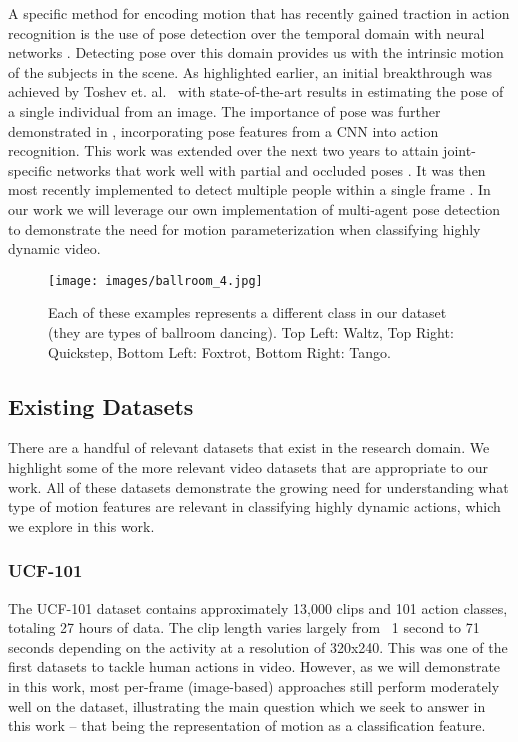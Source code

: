 \documentclass[10pt,twocolumn,letterpaper]{article}
\begin{document}
A specific method for encoding motion that has recently gained traction in action recognition is the use of pose detection over the temporal domain with neural networks \cite{cheron2015p}\cite{liu2016spatio}\cite{toshev2014deeppose}\cite{wei2016convolutional}. Detecting pose over this domain provides us with the intrinsic motion of the subjects in the scene. As highlighted earlier, an initial breakthrough was achieved by Toshev et. al.~\cite{toshev2014deeppose} with state-of-the-art results in estimating the pose of a single individual from an image. The importance of pose was further demonstrated in \cite{cheron2015p}, incorporating pose features from a CNN into action recognition. This work was extended over the next two years to attain joint-specific networks that work well with partial and occluded poses \cite{wei2016convolutional}. It was then most recently implemented to detect multiple people within a single frame \cite{cao2016realtime}. In our work we will leverage our own implementation of multi-agent pose detection to demonstrate the need for motion parameterization when classifying highly dynamic video.
\begin{figure}[t]
	\texttt{[image: images/ballroom\_4.jpg]}
	\caption{\label{fig:ballroom}Each of these examples represents a different class in our dataset (they are types of ballroom dancing). Top Left: Waltz, Top Right: Quickstep, Bottom Left: Foxtrot, Bottom Right: Tango.}
\end{figure}

\subsection{Existing Datasets}

There are a handful of relevant datasets that exist in the research domain. We highlight some of the more relevant video datasets that are appropriate to our work. All of these datasets demonstrate the growing need for understanding what type of motion features are relevant in classifying highly dynamic actions, which we explore in this work.

\subsubsection{UCF-101}

The UCF-101 dataset \cite{soomro2012ucf101} contains approximately 13,000 clips and 101 action classes, totaling 27 hours of data. The clip length varies largely from ~1 second to 71 seconds depending on the activity at a resolution of 320x240. This was one of the first datasets to tackle human actions in video. However, as we will demonstrate in this work, most per-frame (image-based) approaches still perform moderately well on the dataset, illustrating the main question which we seek to answer in this work -- that being the representation of motion as a classification feature.
\end{document}
